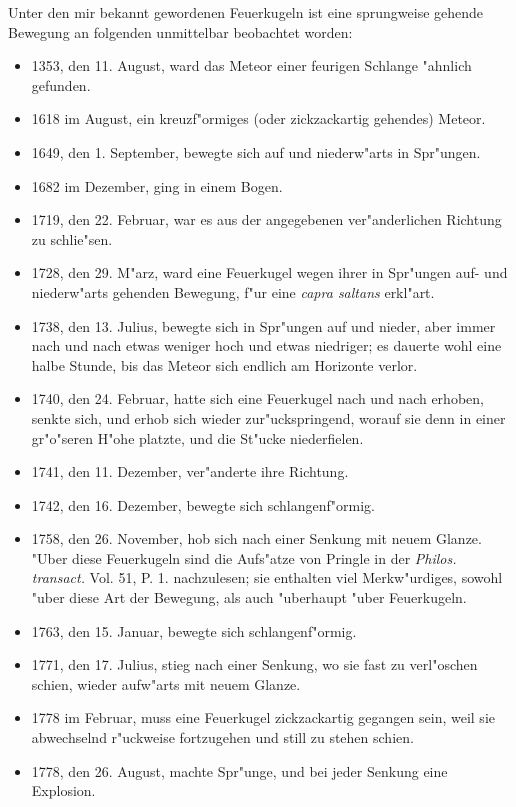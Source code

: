 \documentclass[a4paper, 11pt, oneside, polutonikogreek, german]{article}
\begin{document}
Unter den mir bekannt gewordenen Feuerkugeln ist eine sprungweise gehende Bewegung an folgenden unmittelbar beobachtet worden:
\begin{itemize}
    \item 1353, den 11. August, ward das Meteor einer feurigen Schlange "ahnlich gefunden.
    \item 1618 im August, ein kreuzf"ormiges (oder zickzackartig gehendes) Meteor.
    \item 1649, den 1. September, bewegte sich auf und niederw"arts in Spr"ungen.
    \item 1682 im Dezember, ging in einem Bogen.
    \item 1719, den 22. Februar, war es aus der angegebenen ver"anderlichen Richtung zu schlie"sen.
    \item 1728, den 29. M"arz, ward eine Feuerkugel wegen ihrer in Spr"ungen auf- und niederw"arts gehenden Bewegung, f"ur eine \emph{capra saltans} erkl"art.
    \item 1738, den 13. Julius, bewegte sich in Spr"ungen auf und nieder, aber immer nach und nach etwas weniger hoch und etwas niedriger; es dauerte wohl eine halbe Stunde, bis das Meteor sich endlich am Horizonte verlor.
    \item 1740, den 24. Februar, hatte sich eine Feuerkugel nach und nach erhoben, senkte sich, und erhob sich wieder zur"uckspringend, worauf sie denn in einer gr"o"seren H"ohe platzte, und die St"ucke niederfielen.
    \item 1741, den 11. Dezember, ver"anderte ihre Richtung.
    \item 1742, den 16. Dezember, bewegte sich schlangenf"ormig.
    \item 1758, den 26. November, hob sich nach einer Senkung mit neuem Glanze. "Uber diese Feuerkugeln sind die Aufs"atze von Pringle in der \emph{Philos. transact.} Vol. 51, P. 1. nachzulesen; sie enthalten viel Merkw"urdiges, sowohl "uber diese Art der Bewegung, als auch "uberhaupt "uber Feuerkugeln.
    \item 1763, den 15. Januar, bewegte sich schlangenf"ormig.
    \item 1771, den 17. Julius, stieg nach einer Senkung, wo sie fast zu verl"oschen schien, wieder aufw"arts mit neuem Glanze.
    \item 1778 im Februar, muss eine Feuerkugel zickzackartig gegangen sein, weil sie abwechselnd r"uckweise fortzugehen und still zu stehen schien.
    \item 1778, den 26. August, machte Spr"unge, und bei jeder Senkung eine Explosion.

\end{itemize}
\end{document}
